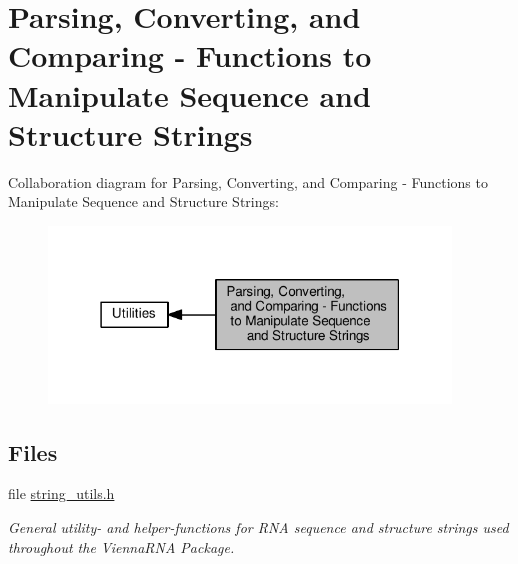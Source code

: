 \hypertarget{group__string__utils}{}\section{Parsing, Converting, and Comparing -\/ Functions to Manipulate Sequence and Structure Strings}
\label{group__string__utils}
Collaboration diagram for Parsing, Converting, and Comparing -\/ Functions to Manipulate Sequence and Structure Strings\+:
\nopagebreak
\begin{figure}[H]
\begin{center}
\leavevmode
\includegraphics[width=303pt]{group__string__utils}
\end{center}
\end{figure}
\subsection*{Files}
\begin{DoxyCompactItemize}
\item 
file \hyperlink{string__utils_8h}{string\+\_\+utils.\+h}
\begin{DoxyCompactList}\small\item\em General utility-\/ and helper-\/functions for R\+N\+A sequence and structure strings used throughout the Vienna\+R\+N\+A Package. \end{DoxyCompactList}\end{DoxyCompactItemize}
